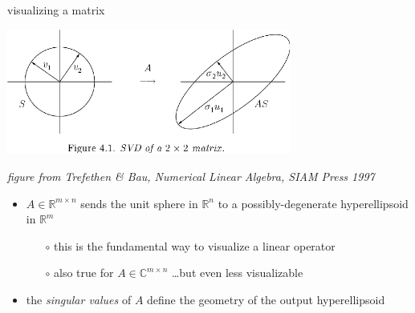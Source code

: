 \documentclass[10pt,hyperref]{beamer}
\newcommand{\CC}{\mathbb{C}}
\newcommand{\RR}{\mathbb{R}}
\begin{document}
\begin{frame}{visualizing a matrix}

\begin{center}
\includegraphics[width=0.7\textwidth]{figs/svd2d}
\end{center}

\vspace{-5mm}
\hfill \tiny \emph{figure from Trefethen \& Bau, \emph{Numerical Linear Algebra}, SIAM Press 1997} \normalsize

\bigskip
\begin{itemize}
\item $A \in \RR^{m\times n}$ sends the unit sphere in $\RR^n$ to a possibly-degenerate hyperellipsoid in $\RR^m$
    \begin{itemize}
    \item[$\circ$] this is the fundamental way to visualize a linear operator
    \item[$\circ$] also true for $A \in \CC^{m\times n}$ \dots but even less visualizable
    \end{itemize}
\item the \emph{singular values} of $A$ define the geometry of the output hyperellipsoid
\end{itemize}
\end{frame}
\end{document}
